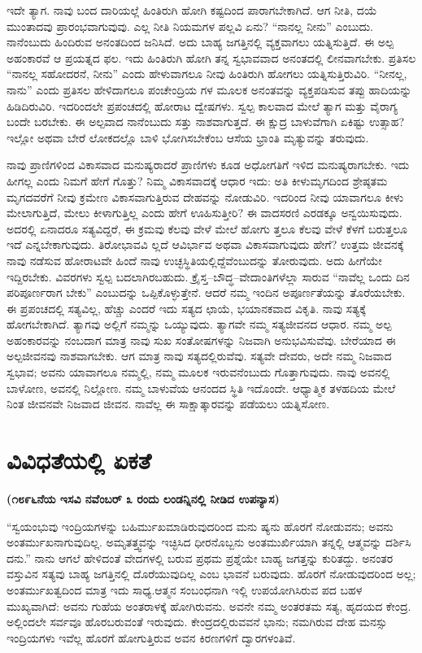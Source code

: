 ಇದೇ ತ್ಯಾಗ. ನಾವು ಬಂದ ದಾರಿಯಲ್ಲೆ ಹಿಂತಿರುಗಿ ಹೋಗಿ ಕಷ್ಟದಿಂದ ಪಾರಾಗಬೇಕಾಗಿದೆ. ಆಗ ನೀತಿ, ದಯೆ ಮುಂತಾದವು ಪ್ರಾರಂಭವಾಗುವುವು. ಎಲ್ಲ ನೀತಿ ನಿಯಮಗಳ ಪಲ್ಲವಿ ಏನು? “ನಾನಲ್ಲ ನೀನು” ಎಂಬುದು. ನಾನೆಂಬುದು ಹಿಂದಿರುವ ಅನಂತದಿಂದ ಜನಿಸಿದೆ. ಅದು ಬಾಹ್ಯ ಜಗತ್ತಿನಲ್ಲಿ ವ್ಯಕ್ತವಾಗಲು ಯತ್ನಿಸುತ್ತಿದೆ. ಈ ಅಲ್ಪ ಅಹಂಕಾರವೆ ಆ ಪ್ರಯತ್ನದ ಫಲ. ಇದು ಹಿಂತಿರುಗಿ ಹೋಗಿ ತನ್ನ ಸ್ವಭಾವವಾದ ಅನಂತದಲ್ಲಿ ಲೀನವಾಗಬೇಕು. ಪ್ರತಿಸಲ “ನಾನಲ್ಲ ಸಹೋದರನೆ, ನೀನು” ಎಂದು ಹೇಳುವಾಗಲೂ ನೀವು ಹಿಂತಿರುಗಿ ಹೋಗಲು ಯತ್ನಿಸುತ್ತಿರುವಿರಿ. “ನೀನಲ್ಲ, ನಾನು” ಎಂದು ಪ್ರತಿಸಲ ಹೇಳಿದಾಗಲೂ ಪಂಚೇಂದ್ರಿಯ ಗಳ ಮೂಲಕ ಅನಂತವನ್ನು ವ್ಯಕ್ತಪಡಿಸುವ ತಪ್ಪು ಹಾದಿಯನ್ನು ಹಿಡಿದಿರುವಿರಿ. ಇದರಿಂದಲೇ ಪ್ರಪಂಚದಲ್ಲಿ ಹೋರಾಟ ದ್ವೇಷಗಳು. ಸ್ವಲ್ಪ ಕಾಲವಾದ ಮೇಲೆ ತ್ಯಾಗ ಮತ್ತು ವೈರಾಗ್ಯ ಬಂದೇ ಬರಬೇಕು. ಈ ಅಲ್ಪವಾದ ನಾನೆಂಬುದು ಸತ್ತು ನಾಶವಾಗುತ್ತದೆ. ಈ ಕ್ಷುದ್ರ ಬಾಳುವೆಗಾಗಿ ಏಕಿಷ್ಟು ಉತ್ಸಾಹ? ಇಲ್ಲೋ ಅಥವಾ ಬೇರೆ ಲೋಕದಲ್ಲೊ ಬಾಳಿ ಭೋಗಿಸಬೇಕೆಂಬ ಆಸೆಯ ಭ್ರಾಂತಿ ಮೃತ್ಯುವನ್ನು ತರುವುದು.

ನಾವು ಪ್ರಾಣಿಗಳಿಂದ ವಿಕಾಸವಾದ ಮನುಷ್ಯರಾದರೆ ಪ್ರಾಣಿಗಳು ಕೂಡ ಅಧೋಗತಿಗೆ ಇಳಿದ ಮನುಷ್ಯರಾಗಬೇಕು. ಇದು ಹೀಗಲ್ಲ ಎಂದು ನಿಮಗೆ ಹೇಗೆ ಗೊತ್ತು? ನಿಮ್ಮ ವಿಕಾಸವಾದಕ್ಕೆ ಆಧಾರ ಇದು: ಅತಿ ಕೀಳುಮೃಗದಿಂದ ಶ್ರೇಷ್ಠತಮ ಮೃಗದವರೆಗೆ ನೀವು ಕ್ರಮೇಣ ವಿಕಾಸವಾಗುತ್ತಿರುವ ದೇಹವನ್ನು ನೋಡುವಿರಿ. ಇದರಿಂದ ನೀವು ಯಾವಾಗಲೂ ಕೀಳು ಮೇಲಾಗುತ್ತಿದೆ, ಮೇಲು ಕೀಳಾಗುತ್ತಿಲ್ಲ ಎಂದು ಹೇಗೆ ಊಹಿಸುತ್ತೀರಿ? ಈ ವಾದಸರಣಿ ಎರಡಕ್ಕೂ ಅನ್ವಯಿಸುವುದು. ಅದರಲ್ಲಿ ಏನಾದರೂ ಸತ್ಯವಿದ್ದರೆ, ಈ ಕ್ರಮವು ಕೆಲವು ವೇಳೆ ಮೇಲೆ ಹೋಗು ತ್ತಲೂ ಕೆಲವು ವೇಳೆ ಕೆಳಗೆ ಬರುತ್ತಲೂ ಇದೆ ಎನ್ನಬೇಕಾಗುವುದು. ತಿರೋಭಾವವಿ ಲ್ಲದೆ ಆವಿರ್ಭಾವ ಅಥವಾ ವಿಕಾಸವಾಗುವುದು ಹೇಗೆ? ಉತ್ತಮ ಜೀವನಕ್ಕೆ ನಾವು ನಡೆಸುವ ಹೋರಾಟವೇ ಹಿಂದೆ ನಾವು ಉಚ್ಛಸ್ಥಿತಿಯಲ್ಲಿದ್ದೆವೆಂಬುದನ್ನು ತೋರುವುದು. ಅದು ಹೀಗೆಯೇ ಇದ್ದಿರಬೇಕು. ವಿವರಗಳು ಸ್ವಲ್ಪ ಬದಲಾಗಿರಬಹುದು. ಕ್ರೈಸ್ತ–ಬೌದ್ಧ–ವೇದಾಂತಿಗಳೆಲ್ಲಾ ಸಾರುವ “ನಾವೆಲ್ಲ ಒಂದು ದಿನ ಪರಿಪೂರ್ಣರಾಗ ಬೇಕು” ಎಂಬುದನ್ನು ಒಪ್ಪಿಕೊಳ್ಳುತ್ತೇನೆ. ಆದರೆ ನಮ್ಮ ಇಂದಿನ ಅಪೂರ್ಣತೆಯನ್ನು ತೊರೆಯಬೇಕು. ಈ ಪ್ರಪಂಚದಲ್ಲಿ ಸತ್ಯವಿಲ್ಲ, ಹೆಚ್ಚು ಎಂದರೆ ಇದು ಸತ್ಯದ ಛಾಯೆ, ಭಯಾನಕವಾದ ವಿಕೃತಿ. ನಾವು ಸತ್ಯಕ್ಕೆ ಹೋಗಬೇಕಾಗಿದೆ. ತ್ಯಾಗವು ಅಲ್ಲಿಗೆ ನಮ್ಮನ್ನು ಒಯ್ಯುವುದು. ತ್ಯಾಗವೇ ನಮ್ಮ ಸತ್ಯಜೀವನದ ಆಧಾರ. ನಮ್ಮ ಅಲ್ಪ ಅಹಂಕಾರವನ್ನು ನಂಬದಾಗ ಮಾತ್ರ ನಾವು ಸುಖ ಸಂತೋಷಗಳನ್ನು ನಿಜವಾಗಿ ಅನುಭವಿಸುವೆವು. ಬೇರೆಯಾದ ಈ ಅಲ್ಪಜೀವನವು ನಾಶವಾಗಬೇಕು. ಆಗ ಮಾತ್ರ ನಾವು ಸತ್ಯದಲ್ಲಿರುವೆವು. ಸತ್ಯವೇ ದೇವರು, ಅದೇ ನಮ್ಮ ನಿಜವಾದ ಸ್ವಭಾವ; ಅವನು ಯಾವಾಗಲೂ ನಮ್ಮಲ್ಲಿ, ನಮ್ಮ ಮೂಲಕ ಇರುವನೆಂಬುದು ಗೊತ್ತಾಗುವುದು. ನಾವು ಅವನಲ್ಲಿ ಬಾಳೋಣ, ಅವನಲ್ಲಿ ನಿಲ್ಲೋಣ. ನಮ್ಮ ಬಾಳುವೆಯ ಆನಂದದ ಸ್ಥಿತಿ ಇದೊಂದೇ. ಆಧ್ಯಾತ್ಮಿಕ ತಳಹದಿಯ ಮೇಲೆ ನಿಂತ ಜೀವನವೇ ನಿಜವಾದ ಜೀವನ. ನಾವೆಲ್ಲ ಈ ಸಾಕ್ಷಾತ್ಕಾರವನ್ನು ಪಡೆಯಲು ಯತ್ನಿಸೋಣ.

\chapter{ವಿವಿಧತೆಯಲ್ಲಿ ಏಕತೆ}

\centerline{\textbf{(೧೮೯೬ನೆಯ ಇಸವಿ ನವೆಂಬರ್​ ೩ ರಂದು ಲಂಡನ್ನಿನಲ್ಲಿ ನೀಡಿದ ಉಪನ್ಯಾಸ)}}

“ಸ್ವಯಂಭುವು ಇಂದ್ರಿಯಗಳನ್ನು ಬಹಿರ್ಮುಖಮಾಡಿರುವುದರಿಂದ ಮನು ಷ್ಯನು ಹೊರಗೆ ನೋಡುವನು; ಅವನು ಅಂತರ್ಮುಖನಾಗುವುದಿಲ್ಲ. ಅಮೃತತ್ತ್ವವನ್ನು ಇಚ್ಛಿಸಿದ ಧೀರನೊಬ್ಬನು ಅಂತಮುರ್ಖಿಯಾಗಿ ತನ್ನಲ್ಲಿ ಆತ್ಮವನ್ನು ದರ್ಶಿಸಿ ದನು.” ನಾನು ಆಗಲೆ ಹೇಳಿದಂತೆ ವೇದಗಳಲ್ಲಿ ಬರುವ ಪ್ರಥಮ ಪ್ರಶ್ನೆಯೇ ಬಾಹ್ಯ ಜಗತ್ತನ್ನು ಕುರಿತದ್ದು. ಅನಂತರ ವಸ್ತುವಿನ ಸತ್ಯವು ಬಾಹ್ಯ ಜಗತ್ತಿನಲ್ಲಿ ದೊರೆಯುವುದಿಲ್ಲ ಎಂಬ ಭಾವನೆ ಬರುವುದು. ಹೊರಗೆ ನೋಡುವುದರಿಂದ ಅಲ್ಲ; ಅಂತರ್ಮುಖತ್ವದಿಂದ ಮಾತ್ರ ಇದು ಸಾಧ್ಯ.ಆತ್ಮನ ಸಂಬಂಧನಾಗಿ ಇಲ್ಲಿ ಉಪಯೋಗಿಸಿರುವ ಪದ ಬಹಳ ಮುಖ್ಯವಾಗಿದೆ: ಅವನು ಗುಹೆಯ ಅಂತರಾಳಕ್ಕೆ ಹೋಗಿರುವನು. ಅವನೇ ನಮ್ಮ ಅಂತರತಮ ಸತ್ಯ, ಹೃದಯದ ಕೇಂದ್ರ. ಅಲ್ಲಿಂದಲೇ ಸರ್ವವೂ ಹೊರಬರುವಂತೆ ಇರುವುದು. ಕೇಂದ್ರದಲ್ಲಿರುವವನೆ ಭಾನು; ನಮಗಿರುವ ದೇಹ ಮನಸ್ಸು ಇಂದ್ರಿಯಗಳು ಇವೆಲ್ಲ ಹೊರಗೆ ಹೋಗುತ್ತಿರುವ ಅವನ ಕಿರಣಗಳಿಗೆ ದ್ವಾರಗಳಂತಿವೆ.

